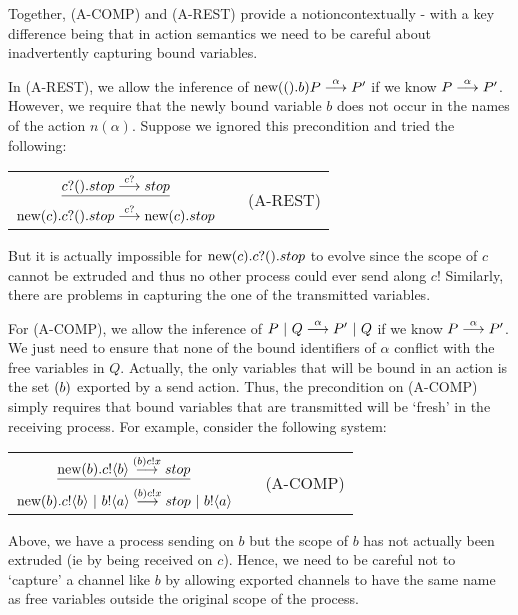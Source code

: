 Together, (A-COMP) and (A-REST) provide a notioncontextually - with a key difference being that in action semantics we need to be careful about inadvertently capturing bound variables.  

In (A-REST), we allow the inference of $\text{new}({(}).b)P \overset{{\alpha}}{\longrightarrow} P'$ if we know $P\overset{{\alpha}}{\longrightarrow} P'$. 
However, we require that the newly bound variable $b$ does not occur in the names of the action  $n(\alpha)$.  
Suppose we ignored this precondition and tried the following:
\begin{center}\begin{tabular}{rllll}
	\multicolumn{3}{c}{$\underline{{c}?({}).stop \overset{{{c}?{}}}{\longrightarrow} stop}$} & & \multirow{2}{*}{\tiny{(A-REST)}}\\
	\multicolumn{3}{c}{$\text{new}({c}). {c}?({}).stop \overset{{{c}?{}}}{\longrightarrow} \text{new}({c}). stop$}\\[10pt]
\end{tabular}\end{center}
But it is actually impossible for $\text{new}({c}). {c}?({}).stop$ to evolve since the scope of $c$ cannot be extruded and thus no other process could ever send along $c$!  Similarly, there are problems in capturing the one of the transmitted variables.  


For (A-COMP), we allow the inference of $P\ |\  Q \overset{{\alpha}}{\longrightarrow} P' \ |\  Q$ if we know $P \overset{{\alpha}}{\longrightarrow} P'$.
We just need to ensure that none of the bound identifiers of $\alpha$ conflict with the free variables in $Q$.  
Actually, the only variables that will be bound in an action is the set $({b})$ exported by a send action.  
Thus, the precondition on (A-COMP) simply requires that bound variables that are transmitted will be `fresh' in the receiving process.  
For example, consider the following system:
\begin{center}\begin{tabular}{rllll}
	\multicolumn{3}{c}{$\underline{\text{new}({b}).{c}!\langle{b}\rangle\overset{{({b}){c}!{x}}}{\longrightarrow} stop}$} & & \multirow{2}{*}{\tiny{(A-COMP)}}\\
	\multicolumn{3}{c}{$\text{new}({b}).{c}!\langle{b}\rangle \ |\  {b}!\langle{a}\rangle\overset{{({b}){c}!{x}}}{\longrightarrow} stop\ |\  {b}!\langle{a}\rangle$}\\[10pt]
\end{tabular}\end{center}
Above, we have a process sending on $b$ but the scope of $b$ has not actually been extruded (ie by being received on $c$).  
Hence, we need to be careful not to `capture' a channel like $b$ by allowing exported channels to have the same name as free variables outside the original scope of the process.

